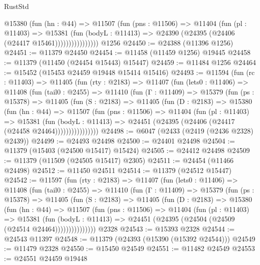 \begin{lexlean}{RustStd}
\begin{coremodule}
                    @15380
                      (fun (hn : @44) =>
                      @11507
                        (fun (pns : @11506) =>
                        @11404
                          (fun (pl : @11403) =>
                          @15381
                            (fun (bodyL : @11413) =>
                            @24390 (@24395 (@24406 (@24417 @15461))))))))))))))))
    @1256
@24450 := @24388 (@11396 @1256)
@24451 := @11379 @24450
@24454 := @11458 (@11459 @1256) @19445
@24458 := @11379 (@11450 (@24454 @15443) @15447)
@24459 := @11484 @1256
@24464 := @15452 (@15453 @24459 @19448 @15414 @15416)
@24493 := @11594
    (fun (rc : @11403) =>
    @11405
      (fun (rty : @2183) =>
      @11407
        (fun (lets0 : @11406) =>
        @11408
          (fun (tail0 : @2455) =>
          @11410
            (fun (Γ : @11409) =>
            @15379
              (fun (ps : @15378) =>
              @11405
                (fun (S : @2183) =>
                @11405
                  (fun (D : @2183) =>
                  @15380
                    (fun (hn : @44) =>
                    @11507
                      (fun (pns : @11506) =>
                      @11404
                        (fun (pl : @11403) =>
                        @15381
                          (fun (bodyL : @11413) =>
                          @24451 (@24395 (@24406 (@24417 (@24458 @24464))))))))))))))))
@24498 := @6047 (@2433 (@2419 (@2436 @2328) @2439))
@24499 := @24493 @24498
@24500 := @24401 @24498
@24504 := @11379 (@15403 (@24500 @15417) @15424)
@24505 := @24412 @24498
@24509 := @11379 (@11509 (@24505 @15417) @2305)
@24511 := @24454 (@11466 @24498)
@24512 := @11450 @24511
@24514 := @11379 (@24512 @15447)
@24542 := @11597
    (fun (rty : @2183) =>
    @11407
      (fun (lets0 : @11406) =>
      @11408
        (fun (tail0 : @2455) =>
        @11410
          (fun (Γ : @11409) =>
          @15379
            (fun (ps : @15378) =>
            @11405
              (fun (S : @2183) =>
              @11405
                (fun (D : @2183) =>
                @15380
                  (fun (hn : @44) =>
                  @11507
                    (fun (pns : @11506) =>
                    @11404
                      (fun (pl : @11403) =>
                      @15381
                        (fun (bodyL : @11413) =>
                        @24451 (@24395 (@24504 (@24509 (@24514 @24464)))))))))))))))
    @2328
@24543 := @15393 @2328
@24544 := @24543 @11397
@24548 := @11379 (@24393 (@15390 (@15392 @24544)))
@24549 := @11479 @2328
@24550 := @15450 @24549
@24551 := @11482 @24549
@24553 := @24551 @24459 @19448

\end{coremodule}
\end{lexlean}
